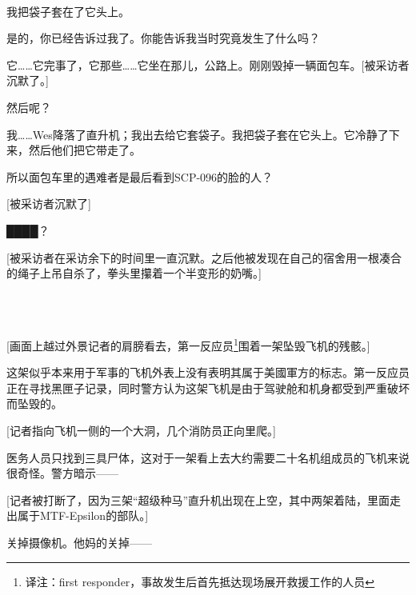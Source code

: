 


\begin{scpbox}

\\

我把袋子套在了它头上。

是的，你已经告诉过我了。你能告诉我当时究竟发生了什么吗？

它……它完事了，它那些……它坐在那儿，公路上。刚刚毁掉一辆面包车。{[}被采访者沉默了。]

然后呢？

我……Wes降落了直升机；我出去给它套袋子。我把袋子套在它头上。它冷静了下来，然后他们把它带走了。

所以面包车里的遇难者是最后看到SCP-096的脸的人？

{[}被采访者沉默了]

████？

{[}被采访者在采访余下的时间里一直沉默。之后他被发现在自己的宿舍用一根凑合的绳子上吊自杀了，拳头里攥着一个半变形的奶嘴。]


\end{scpbox}

\begin{scpbox}

\\
\\

{[}画面上越过外景记者的肩膀看去，第一反应员\footnote{译注：first responder，事故发生后首先抵达现场展开救援工作的人员}围着一架坠毁飞机的残骸。]

这架似乎本来用于军事的飞机外表上没有表明其属于美國軍方的标志。第一反应员正在寻找黑匣子记录，同时警方认为这架飞机是由于驾驶舱和机身都受到严重破坏而坠毁的。

{[}记者指向飞机一侧的一个大洞，几个消防员正向里爬。]

医务人员只找到三具尸体，这对于一架看上去大约需要二十名机组成员的飞机来说很奇怪。警方暗示——

{[}记者被打断了，因为三架“超级种马”直升机出现在上空，其中两架着陆，里面走出属于MTF-Epsilon的部队。]

关掉摄像机。他妈的关掉——


\end{scpbox}

